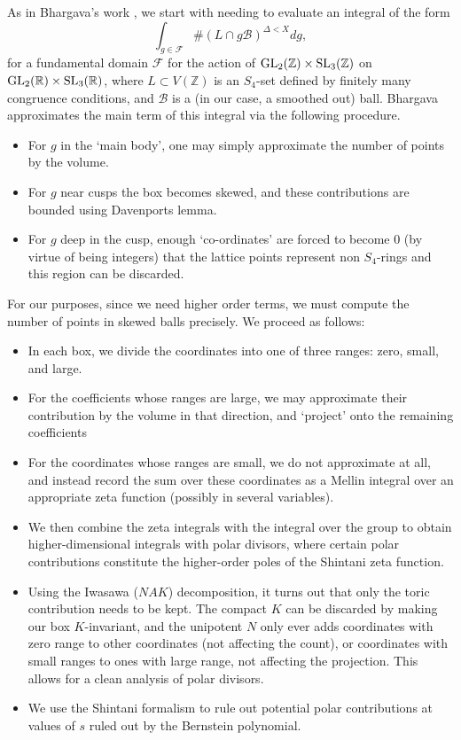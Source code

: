 \documentclass{article}
\def\Z{{\mathbb Z}}
\def\SL{{\rm SL}}
\def\GL{{\rm GL}}
\def\R{{\mathbb R}}
\def\cB{{\mathcal B}}
\def\FF{{\mathcal F}}
\def\Z{{\mathbb Z}}
\begin{document}
As in Bhargava's work \cite{dodqf}, we start with needing to evaluate an integral of the form
$$\int_{g\in\FF} \#(L\cap g\cB)^{\Delta<X}dg,$$
for a fundamental domain $\FF$ for the action of $\GL_2(\Z)\times\SL_3(\Z)$ on $\GL_2(\R)\times\SL_3(\R)$, where $L\subset V(\Z)$ is an $S_4$-set defined by finitely many congruence conditions, and $\cB$ is a (in our case, a smoothed out) ball. Bhargava approximates the main term of this integral via the following procedure.
\begin{itemize}
    \item For $g$ in the `main body', one may simply approximate the number of points by the volume.
    \item For $g$ near cusps the box becomes skewed, and these contributions are bounded using Davenports lemma.
    \item For $g$ deep in the cusp, enough `co-ordinates' are forced to become 0 (by virtue of being integers) that the lattice points represent non $S_4$-rings and this region can be discarded.
\end{itemize}  
For our purposes, since we need higher order terms, we must compute the number of points in skewed balls precisely. We proceed as follows:
\begin{itemize}
    \item In each box, we divide the coordinates into one of three ranges: zero, small, and large.
    \item For the coefficients whose ranges are large, we may approximate their contribution by the volume in that direction, and `project' onto the remaining coefficients
    \item For the coordinates whose ranges are small, we do not approximate at all, and instead record the sum over these coordinates as a Mellin integral over an appropriate zeta function (possibly in several variables).
    \item We then combine the zeta integrals with the integral over the group to obtain higher-dimensional integrals with polar divisors, where certain polar contributions constitute the higher-order poles of the Shintani zeta function.
    \item Using the Iwasawa ($NAK$) decomposition, it turns out that only the toric contribution needs to be kept. The compact $K$ can be discarded by making our box $K$-invariant, and the unipotent $N$ only ever adds coordinates with zero range to other coordinates (not affecting the count), or coordinates with small ranges to ones with large range, not affecting the projection. This allows for a clean analysis of polar divisors.
    \item We use the Shintani formalism to rule out potential polar contributions at values of $s$ ruled out by the Bernstein polynomial. 



\end{itemize}
\end{document}
